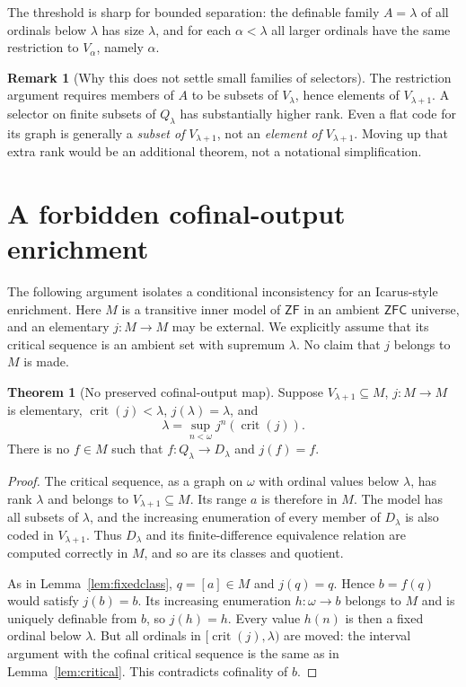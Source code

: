 \documentclass[11pt,letterpaper]{article}
\theoremstyle{definition}
\newtheorem{theorem}[definition]{Theorem}
\newtheorem{remark}[definition]{Remark}
\numberwithin{equation}{section}
\newcommand{\ZFC}{\mathsf{ZFC}}
\newcommand{\ZF}{\mathsf{ZF}}
\newcommand{\crit}{\operatorname{crit}}
\begin{document}
The threshold is sharp for bounded separation: the definable family $A=\lambda$ of all ordinals below $\lambda$ has size $\lambda$, and for each $\alpha<\lambda$ all larger ordinals have the same restriction to $V_\alpha$, namely $\alpha$.

\begin{remark}[Why this does not settle small families of selectors]
The restriction argument requires members of $A$ to be subsets of $V_\lambda$, hence elements of $V_{\lambda+1}$. A selector on finite subsets of $Q_\lambda$ has substantially higher rank. Even a flat code for its graph is generally a \emph{subset of} $V_{\lambda+1}$, not an \emph{element of} $V_{\lambda+1}$. Moving up that extra rank would be an additional theorem, not a notational simplification.
\end{remark}

\section{A forbidden cofinal-output enrichment}\label{sec:icarus}

The following argument isolates a conditional inconsistency for an Icarus-style enrichment. Here $M$ is a transitive inner model of $\ZF$ in an ambient $\ZFC$ universe, and an elementary $j:M\to M$ may be external. We explicitly assume that its critical sequence is an ambient set with supremum $\lambda$. No claim that $j$ belongs to $M$ is made.

\begin{theorem}[No preserved cofinal-output map]\label{thm:inner}
Suppose $V_{\lambda+1}\subseteq M$, $j:M\to M$ is elementary, $\crit(j)<\lambda$, $j(\lambda)=\lambda$, and
\[
 \lambda=\sup_{n<\omega}j^n(\crit(j)).
\]
There is no $f\in M$ such that $f:Q_\lambda\to D_\lambda$ and $j(f)=f$.
\end{theorem}
\begin{proof}
The critical sequence, as a graph on $\omega$ with ordinal values below $\lambda$, has rank $\lambda$ and belongs to $V_{\lambda+1}\subseteq M$. Its range $a$ is therefore in $M$. The model has all subsets of $\lambda$, and the increasing enumeration of every member of $D_\lambda$ is also coded in $V_{\lambda+1}$. Thus $D_\lambda$ and its finite-difference equivalence relation are computed correctly in $M$, and so are its classes and quotient.

As in Lemma~\ref{lem:fixedclass}, $q=[a]\in M$ and $j(q)=q$. Hence $b=f(q)$ would satisfy $j(b)=b$. Its increasing enumeration $h:\omega\to b$ belongs to $M$ and is uniquely definable from $b$, so $j(h)=h$. Every value $h(n)$ is then a fixed ordinal below $\lambda$. But all ordinals in $[\crit(j),\lambda)$ are moved: the interval argument with the cofinal critical sequence is the same as in Lemma~\ref{lem:critical}. This contradicts cofinality of $b$.
\end{proof}
\end{document}
